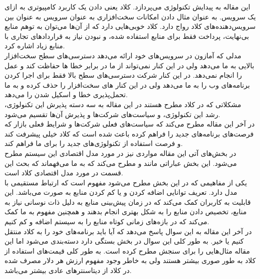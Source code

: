 \documentclass[a4paper, 12pt]{article}
\title{\lr{Above the Clouds: A Berkeley View Of Cloud  Computing}}
\author{حسین افکار}
\begin{document}
\maketitle
این مقاله به پیدایش تکنولوژی
می‌پردازد. کلاد یعنی دادن یک کاربرد کامپیوتری به ازای یک سرویس. به عنوان مثال دادن
امکانات سخت‌افزاری به عنوان سرویس به عنوان
بین سرویس‌دهنده‌های کلاد رواج دارد.
کلاد خوبی‌هایی دارد که از آن‌ها می‌توان به توهم منابع بی‌نهایت، پرداخت فقط برای منابع استفاده شده،
و نبودن نیاز به قرارداد‌های تجاری با منابع زیاد اشاره کرد. \\
مدلی که آمازون در سرویس‌های
خود ارائه می‌دهد دسترسی‌های سطح سخت‌افزار بالایی به ما می‌دهد ولی در این کنار نمی‌تواند از ما
در برابر خطا ها حفاظت کند و عمل
را انجام نمی‌دهد. در این کنار
شرکت
دسترسی‌های سطح بالا فقط برای اجرا کردن برنامه‌های وب را به ما می‌دهد ولی در این کنار
های سخت‌افزار را حذف کرده و به ما تحمل‌پذیری خطا و اسکیل شدن را می‌دهد. \\
مشکلاتی که در کلاد مطرح هستند در این مقاله به سه دسته پذیرش این تکنولوژی، رشد این تکنولوژی، و سیاست‌های
شرکت‌ها و پذیرش آن‌ها تقسیم می‌شود. \\
در آخر این مقاله مطرح می‌کند که سیاست‌های فعلی شرکت‌ها و شرایط فعلی بازار که فرصت‌های برنامه‌های جدید را فراهم کرده باعث شده است
که کلاد خیلی پیشرفت کند و فرصت استفاده از تکنولوژی‌های جدید را برای ما فراهم کند. \\
در بخش‌های آتی این مقاله مواردی نیز در مورد مدل اقتصادی این سیستم مطرح می‌شود.
این بخش عباراتی مانند
و‍‍
مطرح می‌کند که به ما می‌فهماند که بحث این قسمت در مورد مدل اقتصادی کلاد است. \\
یکی از مفاهیمی که در این بخش مطرح می‌شود مفهوم
است که ارتباط مستقیمی با مدل
دارد. تعریف
توانایی اضافه کردن و یا کم کردن منابع به صورت
می‌باشد. این قابلیت به کاربران کمک می‌کند که در زمان پیش‌بینی منابع به دلیل ذات
نوسانی نیاز به منابع، تخصیص دادن منابع را به شکل بهتری انجام بدهند و
همچنین مفهوم
به ما کمک می‌کند که در بازه‌های زمانی کوتاه منابع را به سیستم اضافه و کم کنیم. \\
در آخر این مقاله به این سوال پاسخ می‌دهد که آیا باید برنامه‌های خود را به کلاد منتقل کنیم یا خیر.
به طور کلی این سوال در بخش بستگی دارد دسته‌بندی می‌شود اما این مقاله مثال‌هایی را برای سنجش مطرح
کرده است. به طور کلی قیمت‌های استفاده از کلاد به طور صوری بیشتر هستند
ولی به خاطر وجود مفهوم
ارزش هر دلار مصرف شده در کلاد از دیتا‌سنتر‌‌های عادی بیشتر می‌باشد. \\
\end{document}
